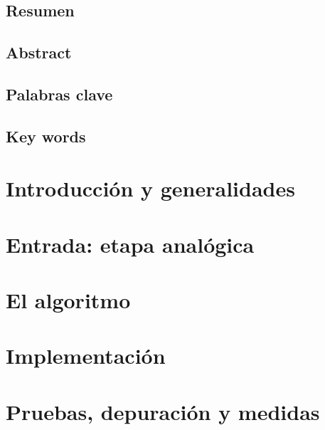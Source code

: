 \documentclass[a4paper, 11pt, oneside, openright]{report}
\begin{document}
\newpage
\vspace*{5cm}


\newpage
\section*{Resumen}

\section*{Abstract}

\newpage
\section*{Palabras clave}

\section*{Key words}

\newpage
\thispagestyle{empty}
\tableofcontents
\clearpage
{}
\pagestyle{fancy}
\chapter{Introducción y generalidades}


\chapter{Entrada: etapa analógica}


\chapter{El algoritmo}


\chapter{Implementación}


\chapter{Pruebas, depuración y medidas}

\end{document}
